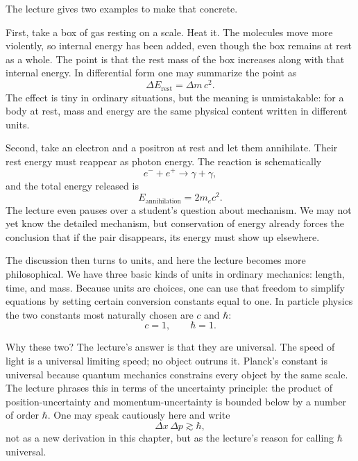 The lecture gives two examples to make that concrete.

First, take a box of gas resting on a scale. Heat it. The molecules move more violently, so internal energy has been added, even though the box remains at rest as a whole. The point is that the rest mass of the box increases along with that internal energy. In differential form one may summarize the point as
\begin{equation}
\Delta E_{\mathrm{rest}} = \Delta m\,c^2.
\end{equation}
The effect is tiny in ordinary situations, but the meaning is unmistakable: for a body at rest, mass and energy are the same physical content written in different units.

Second, take an electron and a positron at rest and let them annihilate. Their rest energy must reappear as photon energy. The reaction is schematically
\begin{equation}
e^- + e^+ \to \gamma + \gamma,
\end{equation}
and the total energy released is
\begin{equation}
E_{\mathrm{annihilation}} = 2m_e c^2.
\end{equation}
The lecture even pauses over a student's question about mechanism. We may not yet know the detailed mechanism, but conservation of energy already forces the conclusion that if the pair disappears, its energy must show up elsewhere.

The discussion then turns to units, and here the lecture becomes more philosophical. We have three basic kinds of units in ordinary mechanics: length, time, and mass. Because units are choices, one can use that freedom to simplify equations by setting certain conversion constants equal to one. In particle physics the two constants most naturally chosen are \(c\) and \(\hbar\):
\begin{equation}
c=1,
\qquad
\hbar=1.
\end{equation}

Why these two? The lecture's answer is that they are universal. The speed of light is a universal limiting speed; no object outruns it. Planck's constant is universal because quantum mechanics constrains every object by the same scale. The lecture phrases this in terms of the uncertainty principle: the product of position-uncertainty and momentum-uncertainty is bounded below by a number of order \(\hbar\). One may speak cautiously here and write
\begin{equation}
\Delta x\,\Delta p \gtrsim \hbar,
\end{equation}
not as a new derivation in this chapter, but as the lecture's reason for calling \(\hbar\) universal.

